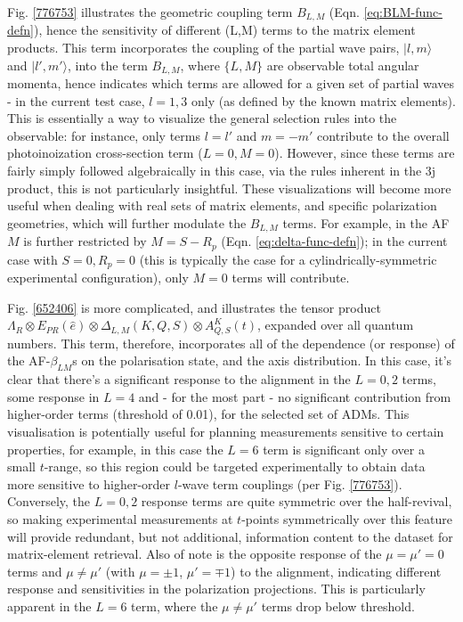 \documentclass[10pt]{article}
\begin{document}
Fig. \ref{776753} illustrates the geometric coupling term $B_{L,M}$ (Eqn. \ref{eq:BLM-func-defn}), hence the sensitivity of different (L,M) terms to the matrix element products. This term incorporates the coupling of the partial wave pairs, $|l,m\rangle$ and $|l',m'\rangle$, into the term $B_{L,M}$, where $\{L,M\}$ are observable total angular momenta, 
hence indicates which terms are allowed for a given set of partial waves - in the current test case, $l=1,3$ only (as defined by the known matrix elements). This is essentially a way to visualize the general selection rules into the observable: for instance, only terms $l=l'$ and $m=-m'$ contribute to the overall photoinoization cross-section term ($L=0, M=0$). However, since these terms are fairly simply followed algebraically in this case, via the rules inherent in the 3j product, this is not particularly insightful. These visualizations will become more useful when dealing with real sets of matrix elements, and specific polarization geometries, which will further modulate the $B_{L,M}$ terms. For example, in the AF $M$ is further restricted by $M = S-R_{p}$ (Eqn. \ref{eq:delta-func-defn}); in the current case with $S=0, R_p=0$ (this is typically the case for a cylindrically-symmetric experimental configuration), only $M=0$ terms will contribute.

Fig. \ref{652406} is more complicated, and illustrates the tensor product $\Lambda_{R}\otimes E_{PR}(\hat{e})\otimes \Delta_{L,M}(K,Q,S)\otimes A^{K}_{Q,S}(t)$, expanded over all quantum numbers.
This term, therefore, incorporates all of the dependence (or response) of the AF-$\beta_{LM}$s on the polarisation state, and the axis distribution. In this case, it's clear that there's a significant response to the alignment in the $L=0,2$ terms, some response in $L=4$ and - for the most part - no significant contribution from higher-order terms (threshold of 0.01), for the selected set of ADMs. This visualisation is potentially useful for planning measurements sensitive to certain properties, for example, in this case the $L=6$ term is significant only over a small $t$-range, so this region could be targeted experimentally to obtain data more sensitive to higher-order $l$-wave term couplings (per Fig. \ref{776753}). Conversely, the $L=0,2$ response terms are quite symmetric over the half-revival, so making experimental measurements at $t$-points symmetrically over this feature will provide redundant, but not additional, information content to the dataset for matrix-element retrieval. Also of note is the opposite response of the $\mu=\mu'=0$ terms and $\mu\neq\mu'$ (with $\mu=\pm1$, $\mu'=\mp1$) to the alignment, indicating different response and sensitivities in the polarization projections. This is particularly apparent in the $L=6$ term, where the $\mu\neq\mu'$ terms drop below threshold.
\end{document}
